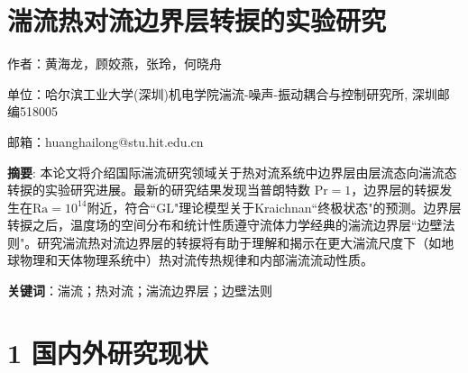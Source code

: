 \documentclass[10pt,aps]{article}
\def\Ra{\textrm{Ra}}
\def\Pr{\textrm{Pr}}
\begin{document}
\section*{ \hskip 5cm {\color{blue}湍流热对流边界层转捩的实验研究}}
\vskip 6pt

\hskip 6cm  作者：黄海龙，顾姣燕，张玲，何晓舟 

{\hskip 2cm \small 单位：哈尔滨工业大学(深圳)机电学院湍流-噪声-振动耦合与控制研究所, 深圳邮编518005}

{\hskip 6cm \small 邮箱：huanghailong@stu.hit.edu.cn} 






\vskip 1cm



\hskip 6pt {\bf 摘要}: 本论文将介绍国际湍流研究领域关于热对流系统中边界层由层流态向湍流态转捩的实验研究进展。最新的研究结果发现当普朗特数 $\Pr = 1$，边界层的转捩发生在$\Ra = 10^{14}$附近，符合``GL"理论模型关于Kraichnan``终极状态"的预测。边界层转捩之后，温度场的空间分布和统计性质遵守流体力学经典的湍流边界层``边壁法则"。研究湍流热对流边界层的转捩将有助于理解和揭示在更大湍流尺度下（如地球物理和天体物理系统中）热对流传热规律和内部湍流流动性质。
\vskip 24pt


\hskip 6pt {\bf 关键词}：湍流；热对流；湍流边界层；边壁法则



\vskip 1.5cm


\section*{1 国内外研究现状}
\vskip 6pt
\end{document}
